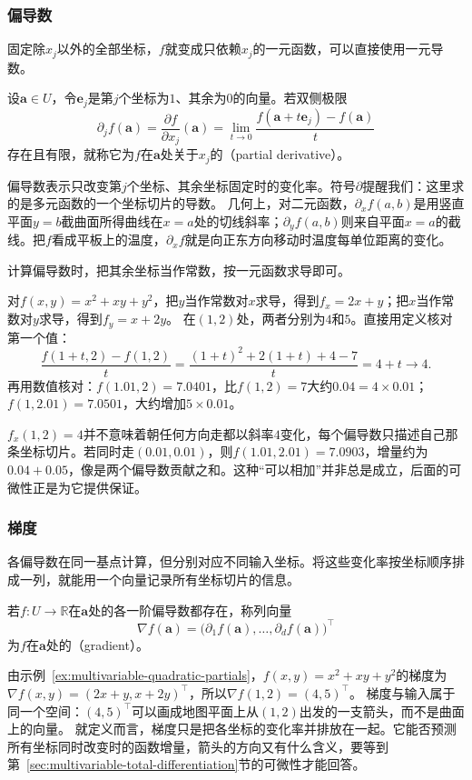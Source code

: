 \subsubsection{偏导数}

固定除$x_j$以外的全部坐标，$f$就变成只依赖$x_j$的一元函数，可以直接使用一元导数。
\begin{definition}[偏导数]
\label{def:multivariable-partial-derivative}
设$\bm a\in U$，令$\bm e_j$是第$j$个坐标为$1$、其余为$0$的向量。若双侧极限
\[
 \partial_jf(\bm a)=\frac{\partial f}{\partial x_j}(\bm a)
 =\lim_{t\to0}\frac{f(\bm a+t\bm e_j)-f(\bm a)}t
\]
存在且有限，就称它为$f$在$\bm a$处关于$x_j$的（partial derivative）。
\end{definition}
偏导数表示只改变第$j$个坐标、其余坐标固定时的变化率。符号$\partial$提醒我们：这里求的是多元函数的一个坐标切片的导数。
几何上，对二元函数，$\partial_xf(a,b)$是用竖直平面$y=b$截曲面所得曲线在$x=a$处的切线斜率；$\partial_yf(a,b)$则来自平面$x=a$的截线。把$f$看成平板上的温度，$\partial_xf$就是向正东方向移动时温度每单位距离的变化。

计算偏导数时，把其余坐标当作常数，按一元函数求导即可。
\begin{example}[二次函数的偏导数]
\label{ex:multivariable-quadratic-partials}
对$f(x,y)=x^2+xy+y^2$，把$y$当作常数对$x$求导，得到$f_x=2x+y$；把$x$当作常数对$y$求导，得到$f_y=x+2y$。
在$(1,2)$处，两者分别为$4$和$5$。直接用定义核对第一个值：
\[
 \frac{f(1+t,2)-f(1,2)}t=\frac{(1+t)^2+2(1+t)+4-7}{t}=4+t\longrightarrow4.
\]
再用数值核对：$f(1.01,2)=7.0401$，比$f(1,2)=7$大约$0.04=4\times0.01$；$f(1,2.01)=7.0501$，大约增加$5\times0.01$。
\end{example}

$f_x(1,2)=4$并不意味着朝任何方向走都以斜率$4$变化，每个偏导数只描述自己那条坐标切片。若同时走$(0.01,0.01)$，则$f(1.01,2.01)=7.0903$，增量约为$0.04+0.05$，像是两个偏导数贡献之和。这种“可以相加”并非总是成立，后面的可微性正是为它提供保证。

\subsubsection{梯度}

各偏导数在同一基点计算，但分别对应不同输入坐标。将这些变化率按坐标顺序排成一列，就能用一个向量记录所有坐标切片的信息。
\begin{definition}[梯度]
\label{def:multivariable-gradient}
若$f:U\to\mathbb R$在$\bm a$处的各一阶偏导数都存在，称列向量
\[
 \nabla f(\bm a)=\bigl(\partial_1f(\bm a),\ldots,\partial_df(\bm a)\bigr)^\top
\]
为$f$在$\bm a$处的（gradient）。
\end{definition}
由示例~\ref{ex:multivariable-quadratic-partials}，$f(x,y)=x^2+xy+y^2$的梯度为$\nabla f(x,y)=(2x+y,x+2y)^\top$，所以$\nabla f(1,2)=(4,5)^\top$。
梯度与输入属于同一个空间：$(4,5)^\top$可以画成地图平面上从$(1,2)$出发的一支箭头，而不是曲面上的向量。
就定义而言，梯度只是把各坐标的变化率并排放在一起。它能否预测所有坐标同时改变时的函数增量，箭头的方向又有什么含义，要等到第~\ref{sec:multivariable-total-differentiation}节的可微性才能回答。

